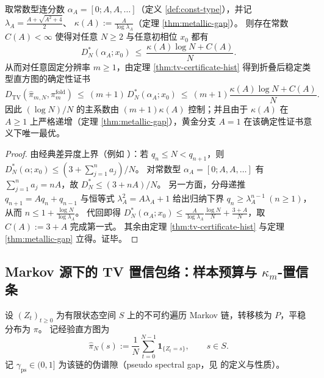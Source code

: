 \begin{corollary}\label{cor:metallic-mean-golden-unique-optimal-tv-constant}
取常数型连分数 \(\alpha_A=[0;A,A,\dots]\)（定义 \ref{def:const-type}），并记
\(\lambda_A=\frac{A+\sqrt{A^2+4}}{2}\)、
\(\kappa(A):=\frac{A}{\log\lambda_A}\)（定理 \ref{thm:metallic-gap}）。
则存在常数 \(C(A)<\infty\) 使得对任意 \(N\ge 2\) 与任意初相位 \(x_0\) 都有
\[
D_N^*(\alpha_A;x_0)\ \le\ \frac{\kappa(A)\log N+C(A)}{N}.
\]
从而对任意固定分辨率 \(m\ge 1\)，由定理 \ref{thm:tv-certificate-hist} 得到折叠后稳定类型直方图的确定性证书
\[
D_{\mathrm{TV}}(\hat{\pi}_{m,N},\pi_m^{\mathrm{fold}})
\ \le\ (m+1)\,D_N^*(\alpha_A;x_0)
\ \le\ (m+1)\frac{\kappa(A)\log N+C(A)}{N}.
\]
因此 \((\log N)/N\) 的主系数由 \((m+1)\kappa(A)\) 控制；并且由于 \(\kappa(A)\) 在 \(A\ge 1\) 上严格递增（定理 \ref{thm:metallic-gap}），黄金分支 \(A=1\) 在该确定性证书意义下唯一最优。
\end{corollary}
\begin{proof}
由经典差异度上界（例如 \cite{KuipersNiederreiter1974}）：若 \(q_n\le N<q_{n+1}\)，则
\(
D_N^*(\alpha;x_0)\le (3+\sum_{j=1}^{n}a_j)/N
\)。
对常数型 \(\alpha_A=[0;A,A,\dots]\) 有 \(\sum_{j=1}^{n}a_j=nA\)，故 \(D_N^*\le (3+nA)/N\)。
另一方面，分母递推 \(q_{n+1}=Aq_n+q_{n-1}\) 与恒等式 \(\lambda_A^2=A\lambda_A+1\) 给出归纳下界 \(q_n\ge \lambda_A^{n-1}\ (n\ge 1)\)，从而
\(
n\le 1+\frac{\log N}{\log\lambda_A}
\)。
代回即得
\(
D_N^*(\alpha_A;x_0)\le \frac{A}{\log\lambda_A}\frac{\log N}{N}+\frac{3+A}{N}
\)，取 \(C(A):=3+A\) 完成第一式。
其余由定理 \ref{thm:tv-certificate-hist} 与定理 \ref{thm:metallic-gap} 立得。证毕。
\end{proof}

\subsection{Markov 源下的 TV 置信包络：样本预算与 \texorpdfstring{$\kappa_m$}{kappa}-置信条}\label{subsec:markov-tv-envelope}


\begin{definition}[伪谱隙与经验直方图]\label{def:markov-pseudo-gap-hist}
设 \((Z_t)_{t\ge 0}\) 为有限状态空间 \(S\) 上的不可约遍历 Markov 链，转移核为 \(P\)，平稳分布为 \(\pi\)。
记经验直方图为
\[
\hat{\pi}_N(s):=\frac{1}{N}\sum_{t=0}^{N-1}\mathbf{1}_{\{Z_t=s\}},\qquad s\in S.
\]
记 \(\gamma_{\mathrm{ps}}\in(0,1]\) 为该链的伪谱隙（pseudo spectral gap，见 \cite{Paulin2015MarkovConcentration} 的定义与性质）。
\end{definition}

